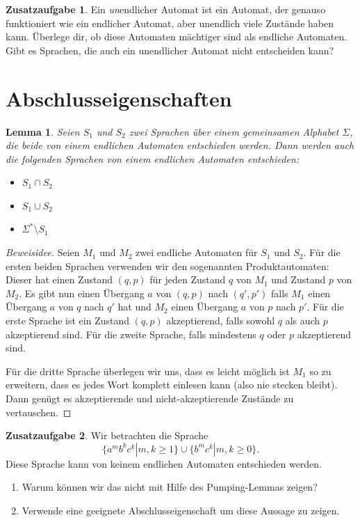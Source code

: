 \documentclass[a4paper,ngerman,12pt]{scrartcl}
\theoremstyle{definition}
\newtheorem{zaufg}{Zusatzaufgabe}
\theoremstyle{plain}
\newtheorem{lemma}[defn]{Lemma}
\theoremstyle{remark}
\begin{document}
\begin{zaufg}
	Ein \emph{un}endlicher Automat ist ein Automat, der genauso funktioniert wie ein endlicher Automat, aber unendlich viele Zustände haben kann. Überlege dir, ob diese Automaten mächtiger sind als endliche Automaten. Gibt es Sprachen, die auch ein unendlicher Automat nicht entscheiden kann?
\end{zaufg}

\section{Abschlusseigenschaften}

\begin{lemma}\label{lemma:EAAbschlusseigenschaften}
	Seien $S_1$ und $S_2$ zwei Sprachen über einem gemeinsamen Alphabet $\Sigma$, die beide von einem endlichen Automaten entschieden werden. Dann werden auch die folgenden Sprachen von einem endlichen Automaten entschieden:
	\begin{itemize}
		\item $S_1 \cap S_2$
		\item $S_1 \cup S_2$
		\item $\Sigma^* \setminus S_1$
	\end{itemize}
\end{lemma}

\begin{proof}[Beweisidee]
	Seien $M_1$ und $M_2$ zwei endliche Automaten für $S_1$ und $S_2$. Für die ersten beiden Sprachen verwenden wir den sogenannten Produktautomaten: Dieser hat einen Zustand $(q,p)$ für jeden Zustand $q$ von $M_1$ und Zustand $p$ von $M_2$. Es gibt nun einen Übergang $a$ von $(q,p)$ nach $(q',p')$ falls $M_1$ einen Übergang $a$ von $q$ nach $q'$ hat und $M_2$ einen Übergang $a$ von $p$ nach $p'$. Für die erste Sprache ist ein Zustand $(q,p)$ akzeptierend, falls sowohl $q$ als auch $p$ akzeptierend sind. Für die zweite Sprache, falls mindestens $q$ oder $p$ akzeptierend sind.
	
	Für die dritte Sprache überlegen wir uns, dass es leicht möglich ist $M_1$ so zu erweitern, dass es jedes Wort komplett einlesen kann (also nie stecken bleibt). Dann genügt es akzeptierende und nicht-akzeptierende Zustände zu vertauschen.
\end{proof}

\begin{zaufg}
	Wir betrachten die Sprache
		\[\{a^mb^kc^k | m,k \geq 1\} \cup \{b^mc^k | m,k \geq 0\}.\]
	Diese Sprache kann von keinem endlichen Automaten entschieden werden.
	\begin{enumerate}[label=\alph*)]
		\item Warum können wir das nicht mit Hilfe des Pumping-Lemmas zeigen?
		\item Verwende eine geeignete Abschlusseigenschaft um diese Aussage zu zeigen.
	\end{enumerate}
\end{zaufg}
\end{document}

